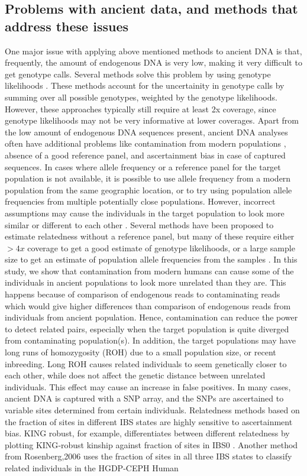 \documentclass[12pt, letterpaper]{article}
\begin{document}
\subsection{Problems with ancient data, and methods that address these issues}
One major issue with applying above mentioned methods to ancient DNA is that, frequently, the amount of endogenous DNA is very low, making it very difficult to get genotype calls.
Several methods solve this problem by using genotype likelihoods \cite{lipatov_maximum_2015,korneliussen_ngsrelate_2015}. These methods account for the uncertainity in genotype calls by summing over all possible genotypes, weighted by the genotype likelihoods. However, these approaches typically still require at least 2x coverage, since genotype likelihoods may not be very informative at lower coverages. Apart from the low amount of endogenous DNA sequences present, ancient DNA analyses often have additional problems like contamination from modern populations \cite{peyregne_authentict_2020}, absence of a good reference panel, and ascertainment bias in case of captured sequences. In cases where allele frequency or a reference panel for the target population is not available, it is possible to use allele frequency from a modern population from the same geographic location, or to try using population allele frequencies from multiple potentially close populations. However, incorrect assumptions may cause the individuals in the target population to look more similar or different to each other \cite{amorim_understanding_2018}. Several methods have been proposed to estimate relatedness without a reference panel, but many of these require either $>4x$ coverage to get a good estimate of genotype likelihoods\cite{waples_allele_2019}, or a large sample size to get an estimate of population allele frequencies from the samples \cite{theunert_joint_2017}. In this study, we show that contamination from modern humans can cause some of the individuals in ancient populations to look more unrelated than they are. This happens because of comparison of endogenous reads to contaminating reads which would give higher differences than comparison of endogenous reads from individuals from ancient population. Hence, contamination can reduce the power to detect related pairs, especially when the target population is quite diverged from contaminating population(s). In addition, the target populations may have long runs of homozygosity (ROH) due to a small population size, or recent inbreeding. Long ROH causes related individuals to seem genetically closer to each other, while does not affect the genetic distance between unrelated individuals. This effect may cause an increase in false positives. In many cases, ancient DNA is captured with a SNP array, and the SNPs are ascertained to variable sites determined from certain individuals. Relatedness methods based on the fraction of sites in different IBS states are highly sensitive to ascertainment bias. KING robust, for example, differentiates between different relatedness by plotting KING‐robust kinship against fraction of sites in IBS0 \cite{manichaikul_robust_2010}. Another method from Rosenberg,2006 \cite{rosenberg_standardized_2006} uses the fraction of sites in all three IBS states to classify related individuals in the HGDP-CEPH Human 
\end{document}
